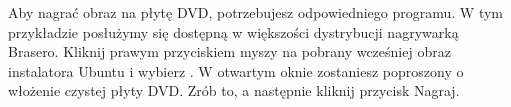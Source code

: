 Aby nagrać obraz na płytę DVD, potrzebujesz odpowiedniego programu. W tym przykładzie posłużymy się dostępną w większości dystrybucji nagrywarką Brasero. Kliknij prawym przyciskiem myszy na pobrany wcześniej obraz instalatora Ubuntu i wybierz
. W otwartym oknie zostaniesz poproszony o włożenie czystej płyty DVD. Zrób to, a następnie kliknij przycisk \textcolor{ubuntu_orange}{Nagraj}.
